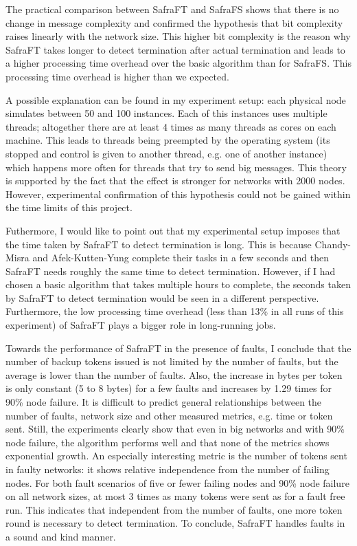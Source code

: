 The practical comparison between SafraFT and SafraFS shows that there is no change in message complexity and confirmed the hypothesis that bit complexity raises linearly with the network size.
This higher bit complexity is the reason why SafraFT takes longer to detect termination after actual termination and leads to a higher processing time overhead over the basic algorithm than for SafraFS.
This processing time overhead is higher than we expected.

A possible explanation can be found in my experiment setup: each physical node simulates between 50 and 100 instances.
Each of this instances uses multiple threads; altogether there are at least 4 times as many threads as cores on each machine.
This leads to threads being preempted by the operating system (its stopped and control is given to another thread, e.g. one of another instance) which happens more often for threads that try to send big messages.
This theory is supported by the fact that the effect is stronger for networks with 2000 nodes.
However, experimental confirmation of this hypothesis could not be gained within the time limits of this project.

Futhermore, I would like to point out that my experimental setup imposes that the time taken by SafraFT to detect termination is long.
This is because Chandy-Misra and Afek-Kutten-Yung complete their tasks in a few seconds and then SafraFT needs roughly the same time to detect termination.
However, if I had chosen a basic algorithm that takes multiple hours to complete, the seconds taken by SafraFT to detect termination would be seen in a different perspective.
Furthermore, the low processing time overhead (less than 13\% in all runs of this experiment)  %
of SafraFT plays a bigger role in long-running jobs.

Towards the performance of SafraFT in the presence of faults, I conclude that the number of backup tokens issued is not limited by the number of faults, but the average is lower than the number of faults.
Also, the increase in bytes per token is only constant (5 to 8 bytes) for a few faults and increases by 1.29 times for 90\% node failure.  %
It is difficult to predict general relationships between the number of faults, network size and other measured metrics, e.g. time or token sent.
Still, the experiments clearly show that even in big networks and with 90\% node failure, the algorithm performs well and that none of the metrics shows exponential growth.
An especially interesting metric is the number of tokens sent in faulty networks: it shows relative independence from the number of failing nodes.
For both fault scenarios of five or fewer failing nodes and 90\% node failure on all network sizes, at most 3 times as many tokens were sent as for a fault free run. %
This indicates that independent from the number of faults, one more token round is necessary to detect termination.
To conclude, SafraFT handles faults in a sound and kind manner.

